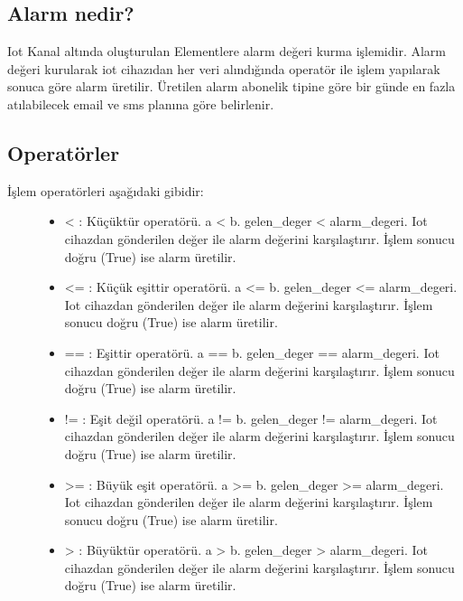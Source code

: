 \documentclass[letterpaper,10pt,turkish]{sphinxmanual}
\begin{document}
\subsection{Alarm nedir?}
\label{\detokenize{email-sms-alert:alarm-nedir}}
Iot Kanal altında oluşturulan Elementlere alarm değeri kurma işlemidir. Alarm değeri kurularak iot cihazıdan her veri
alındığında operatör ile işlem yapılarak sonuca göre alarm üretilir. Üretilen alarm abonelik tipine göre bir günde en fazla
atılabilecek email ve sms planına göre belirlenir.


\subsection{Operatörler}
\label{\detokenize{email-sms-alert:operatorler}}\begin{description}
\item[{İşlem operatörleri aşağıdaki gibidir:}] \leavevmode\begin{itemize}
\item {} 
\textless{}   : Küçüktür operatörü. a \textless{} b. gelen\_deger \textless{} alarm\_degeri. Iot cihazdan gönderilen değer ile alarm değerini karşılaştırır. İşlem sonucu doğru (True) ise alarm üretilir.

\item {} 
\textless{}=  : Küçük eşittir operatörü. a \textless{}= b. gelen\_deger \textless{}= alarm\_degeri. Iot cihazdan gönderilen değer ile alarm değerini karşılaştırır. İşlem sonucu doğru (True) ise alarm üretilir.

\item {} 
==  : Eşittir operatörü. a == b. gelen\_deger == alarm\_degeri. Iot cihazdan gönderilen değer ile alarm değerini karşılaştırır. İşlem sonucu doğru (True) ise alarm üretilir.

\item {} 
!=  : Eşit değil operatörü. a != b. gelen\_deger != alarm\_degeri. Iot cihazdan gönderilen değer ile alarm değerini karşılaştırır. İşlem sonucu doğru (True) ise alarm üretilir.

\item {} 
\textgreater{}=  : Büyük eşit operatörü. a \textgreater{}= b. gelen\_deger \textgreater{}= alarm\_degeri. Iot cihazdan gönderilen değer ile alarm değerini karşılaştırır. İşlem sonucu doğru (True) ise alarm üretilir.

\item {} 
\textgreater{}   : Büyüktür operatörü. a \textgreater{} b. gelen\_deger \textgreater{} alarm\_degeri. Iot cihazdan gönderilen değer ile alarm değerini karşılaştırır. İşlem sonucu doğru (True) ise alarm üretilir.

\end{itemize}

\end{description}
\end{document}
